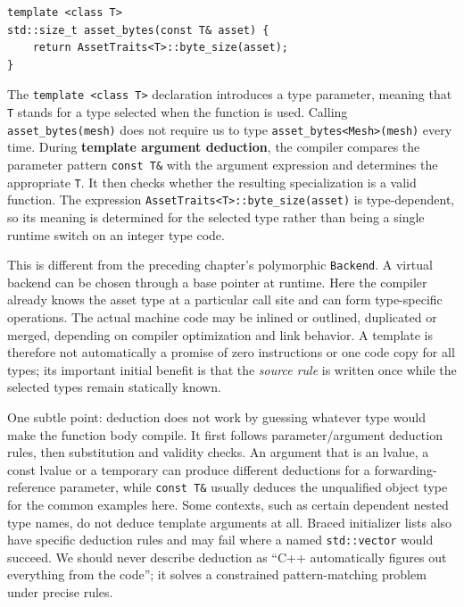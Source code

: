 \begin{verbatim}
template <class T>
std::size_t asset_bytes(const T& asset) {
    return AssetTraits<T>::byte_size(asset);
}
\end{verbatim}

The \texttt{template\ \textless{}class\ T\textgreater{}} declaration introduces a type parameter, meaning that \texttt{T} stands for a type selected when the function is used. Calling \texttt{asset\_bytes(mesh)} does not require us to type \texttt{asset\_bytes\textless{}Mesh\textgreater{}(mesh)} every time. During \textbf{template argument deduction}, the compiler compares the parameter pattern \texttt{const\ T\&} with the argument expression and determines the appropriate \texttt{T}. It then checks whether the resulting specialization is a valid function. The expression \texttt{AssetTraits\textless{}T\textgreater{}::byte\_size(asset)} is type-dependent, so its meaning is determined for the selected type rather than being a single runtime switch on an integer type code.

This is different from the preceding chapter's polymorphic \texttt{Backend}. A virtual backend can be chosen through a base pointer at runtime. Here the compiler already knows the asset type at a particular call site and can form type-specific operations. The actual machine code may be inlined or outlined, duplicated or merged, depending on compiler optimization and link behavior. A template is therefore not automatically a promise of zero instructions or one code copy for all types; its important initial benefit is that the \emph{source rule} is written once while the selected types remain statically known.

One subtle point: deduction does not work by guessing whatever type would make the function body compile. It first follows parameter/argument deduction rules, then substitution and validity checks. An argument that is an lvalue, a const lvalue or a temporary can produce different deductions for a forwarding-reference parameter, while \texttt{const\ T\&} usually deduces the unqualified object type for the common examples here. Some contexts, such as certain dependent nested type names, do not deduce template arguments at all. Braced initializer lists also have specific deduction rules and may fail where a named \texttt{std::vector} would succeed. We should never describe deduction as ``C++ automatically figures out everything from the code''; it solves a constrained pattern-matching problem under precise rules.

